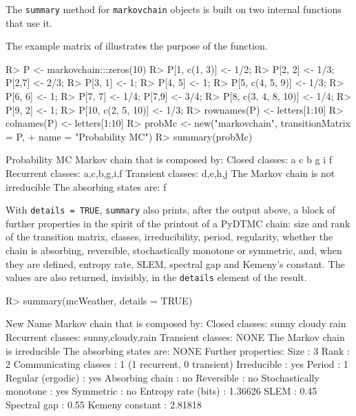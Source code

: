\documentclass[
  nojss]{jss}
\begin{document}
The \texttt{summary} method for \texttt{markovchain} objects is built on two internal functions that use it.

The example matrix of \cite{renaldoMatlab} illustrates the purpose of the function.

\begin{CodeChunk}
\begin{CodeInput}
R> P <- markovchain:::zeros(10)
R> P[1, c(1, 3)] <- 1/2;
R> P[2, 2] <- 1/3; P[2,7] <- 2/3;
R> P[3, 1] <- 1;
R> P[4, 5] <- 1;
R> P[5, c(4, 5, 9)] <- 1/3;
R> P[6, 6] <- 1;
R> P[7, 7] <- 1/4; P[7,9] <- 3/4;
R> P[8, c(3, 4, 8, 10)] <- 1/4;
R> P[9, 2] <- 1;
R> P[10, c(2, 5, 10)] <- 1/3;
R> rownames(P) <- letters[1:10] 
R> colnames(P) <- letters[1:10]
R> probMc <- new("markovchain", transitionMatrix = P, 
+               name = "Probability MC")
R> summary(probMc)
\end{CodeInput}
\begin{CodeOutput}
Probability MC  Markov chain that is composed by: 
Closed classes: 
a c 
b g i 
f 
Recurrent classes: 
{a,c},{b,g,i},{f}
Transient classes: 
{d,e},{h},{j}
The Markov chain is not irreducible 
The absorbing states are: f
\end{CodeOutput}
\end{CodeChunk}

With \texttt{details\ =\ TRUE}, \texttt{summary} also prints, after the output above, a
block of further properties in the spirit of the printout of a PyDTMC
chain: size and rank of the transition matrix, classes, irreducibility,
period, regularity, whether the chain is absorbing, reversible,
stochastically monotone or symmetric, and, when they are defined, entropy
rate, SLEM, spectral gap and Kemeny's constant. The values are also
returned, invisibly, in the \texttt{details} element of the result.

\begin{CodeChunk}
\begin{CodeInput}
R> summary(mcWeather, details = TRUE)
\end{CodeInput}
\begin{CodeOutput}
New Name  Markov chain that is composed by: 
Closed classes: 
sunny cloudy rain 
Recurrent classes: 
{sunny,cloudy,rain}
Transient classes: 
NONE 
The Markov chain is irreducible 
The absorbing states are: NONE
Further properties: 
  Size                    : 3 
  Rank                    : 2 
  Communicating classes   : 1 (1 recurrent, 0 transient) 
  Irreducible             : yes 
  Period                  : 1 
  Regular (ergodic)       : yes 
  Absorbing chain         : no 
  Reversible              : no 
  Stochastically monotone : yes 
  Symmetric               : no 
  Entropy rate (bits)     : 1.36626 
  SLEM                    : 0.45 
  Spectral gap            : 0.55 
  Kemeny constant         : 2.81818 
\end{CodeOutput}
\end{CodeChunk}
\end{document}
